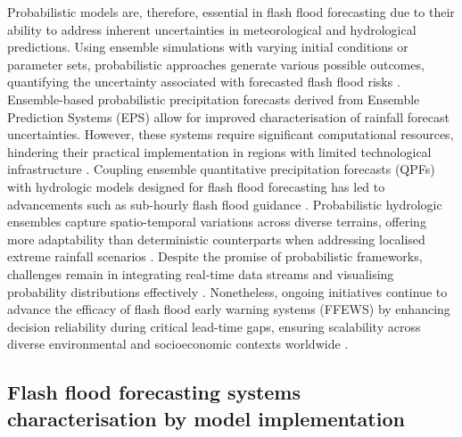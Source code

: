 Probabilistic  models are, therefore, essential in flash flood forecasting due to their ability to address inherent uncertainties in meteorological and hydrological predictions. Using ensemble simulations with varying initial conditions or parameter sets, probabilistic approaches generate various possible outcomes, quantifying the uncertainty associated with forecasted flash flood risks \citep{Yang2022}. Ensemble-based probabilistic precipitation forecasts derived from Ensemble Prediction Systems (EPS) allow for improved characterisation of rainfall forecast uncertainties. However, these systems require significant computational resources, hindering their practical implementation in regions with limited technological infrastructure \citep{Poolman2014}. Coupling ensemble quantitative precipitation forecasts (QPFs) with hydrologic models designed for flash flood forecasting has led to advancements such as sub-hourly flash flood guidance \citep{Martinaitis2023, Barthold2015}. Probabilistic hydrologic ensembles capture spatio-temporal variations across diverse terrains, offering more adaptability than deterministic counterparts when addressing localised extreme rainfall scenarios \citep{Filho2021}. Despite the promise of probabilistic frameworks, challenges remain in integrating real-time data streams and visualising probability distributions effectively \citep{Alfieri2015, AlRawas2024}. Nonetheless, ongoing initiatives continue to advance the efficacy of flash flood early warning systems (FFEWS) by enhancing decision reliability during critical lead-time gaps, ensuring scalability across diverse environmental and socioeconomic contexts worldwide \citep{Yang2022, Zanchetta2020}.

\subsection{Flash flood forecasting systems characterisation by model implementation}

